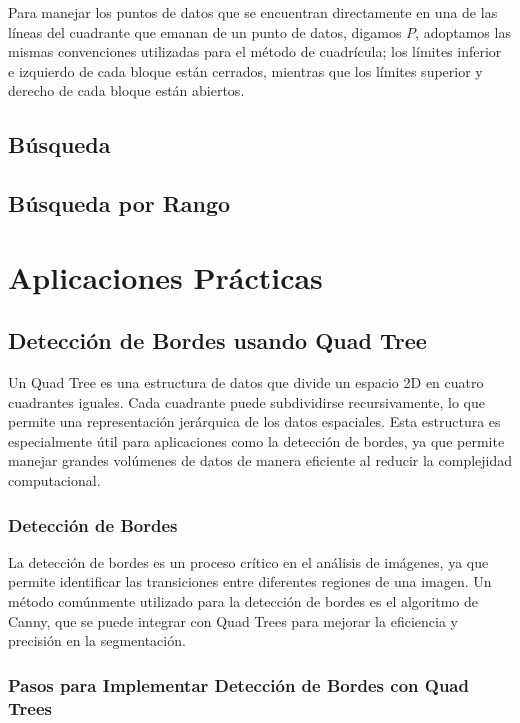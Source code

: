 \documentclass[9pt,a4paper,twoside]{rho-class/rho}
\begin{document}
            Para manejar los puntos de datos que se encuentran directamente en una de las líneas del cuadrante que emanan de un punto de datos, digamos \(P\), adoptamos las mismas convenciones utilizadas para el método de cuadrícula; los límites inferior e izquierdo de cada bloque están cerrados, mientras que los límites superior y derecho de cada bloque están abiertos.
        \subsection{Búsqueda}
        \subsection{Búsqueda por Rango}
    \section{Aplicaciones Prácticas}
        \subsection{Detección de Bordes usando Quad Tree}

        Un Quad Tree es una estructura de datos que divide un espacio 2D en cuatro cuadrantes iguales. Cada cuadrante puede subdividirse recursivamente, lo que permite una representación jerárquica de los datos espaciales. Esta estructura es especialmente útil para aplicaciones como la detección de bordes, ya que permite manejar grandes volúmenes de datos de manera eficiente al reducir la complejidad computacional.
        
            \subsubsection{Detección de Bordes}
            
            La detección de bordes es un proceso crítico en el análisis de imágenes, ya que permite identificar las transiciones entre diferentes regiones de una imagen. Un método comúnmente utilizado para la detección de bordes es el algoritmo de Canny, que se puede integrar con Quad Trees para mejorar la eficiencia y precisión en la segmentación.
            
            \subsubsection{Pasos para Implementar Detección de Bordes con Quad Trees}
            
\end{document}

